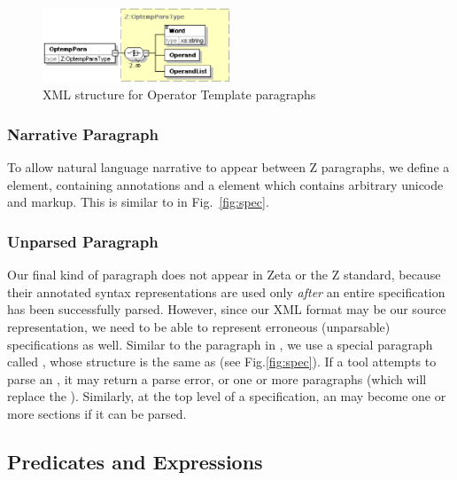 \documentclass{llncs}  %
\newcommand{\Zeta}{Zeta}
\begin{document}
\begin{figure}[htb]
  \centering
  \includegraphics[width=0.5\textwidth]{optemppara.eps}
  \caption{XML structure for Operator Template paragraphs}
  \label{fig:optemppara}
\end{figure}


\subsubsection{Narrative Paragraph}

To allow natural language narrative to appear between Z paragraphs,
we define a  element, containing annotations
and a  element which contains arbitrary unicode and
markup.  This is similar to  in Fig.~\ref{fig:spec}.

\subsubsection{Unparsed Paragraph}

Our final kind of paragraph does not appear in {\Zeta}
or the Z standard, because their annotated syntax representations
are used only \emph{after} an entire specification has been successfully
parsed.  However, since our XML format may be our source representation,
we need to be able to represent erroneous (unparsable) specifications as
well.  Similar to the  paragraph in \CADiZ, we use a
special paragraph called , whose structure is the
same as  (see Fig.\ref{fig:spec}).
If a tool attempts to parse an , it may return a parse
error, or one or more paragraphs (which will replace the
).  Similarly, at the top level of a specification, an
 may become one or more sections if it can be parsed.



\subsection{Predicates and Expressions} \label{sec:expr}
\end{document}

